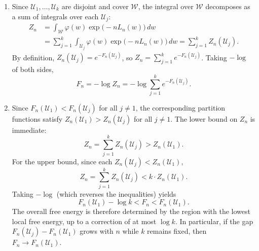 \documentclass[11pt]{article}
\newcommand{\W}{\mathcal{W}}
\newcommand{\U}{\mathcal{U}}
\begin{document}
\begin{solution}
\begin{enumerate}
    \item
        Since $\U_1, \ldots, \U_k$ are disjoint and cover $\W$, the integral
        over $\W$ decomposes as a sum of integrals over each $\U_j$:
        \begin{align*}
            Z_n
            &= \int_{\W} \varphi(w) \exp\!\big({-}n L_n(w)\big)\, dw
            \\
            &= \sum_{j=1}^{k}
                \int_{\U_j} \varphi(w) \exp\!\big({-}n L_n(w)\big)\, dw
            = \sum_{j=1}^{k} Z_n(\U_j).
        \end{align*}
        By definition, $Z_n(\U_j) = e^{-F_n(\U_j)}$, so
        $Z_n = \sum_{j=1}^{k} e^{-F_n(\U_j)}$.
        Taking $-\log$ of both sides,
        \begin{equation*}
            F_n = -\log Z_n = -\log \sum_{j=1}^{k} e^{-F_n(\U_j)}.
        \end{equation*}

    \item
        Since $F_n(\U_1) < F_n(\U_j)$ for all $j \neq 1$, the corresponding
        partition functions satisfy $Z_n(\U_1) > Z_n(\U_j)$ for all $j \neq 1$.
        The lower bound on $Z_n$ is immediate:
        \begin{equation*}
            Z_n = \sum_{j=1}^{k} Z_n(\U_j) > Z_n(\U_1).
        \end{equation*}
        For the upper bound, since each $Z_n(\U_j) < Z_n(\U_1)$,
        \begin{equation*}
            Z_n = \sum_{j=1}^{k} Z_n(\U_j) < k \cdot Z_n(\U_1).
        \end{equation*}
        Taking $-\log$ (which reverses the inequalities) yields
        \begin{equation*}
            F_n(\U_1) - \log k < F_n < F_n(\U_1).
        \end{equation*}
        The overall free energy is therefore determined by the region with
        the lowest local free energy, up to a correction of at most $\log k$.
        In particular, if the gap $F_n(\U_j) - F_n(\U_1)$ grows with $n$ while
        $k$ remains fixed, then $F_n \to F_n(\U_1)$.
        \qedhere
\end{enumerate}
\end{solution}

\end{document}
